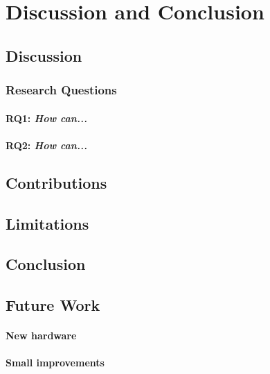 
\chapter{Discussion and Conclusion}

\section{Discussion}


\subsection{Research Questions}  \label{RQDiscussion}


\subsubsection{RQ1: \textit{How can...}} 


\subsubsection{RQ2: \textit{How can...}}


\section{Contributions}



\section{Limitations}




\section{Conclusion}


\section{Future Work}

\subsubsection{New hardware}

\subsubsection{Small improvements}

\cleardoublepage